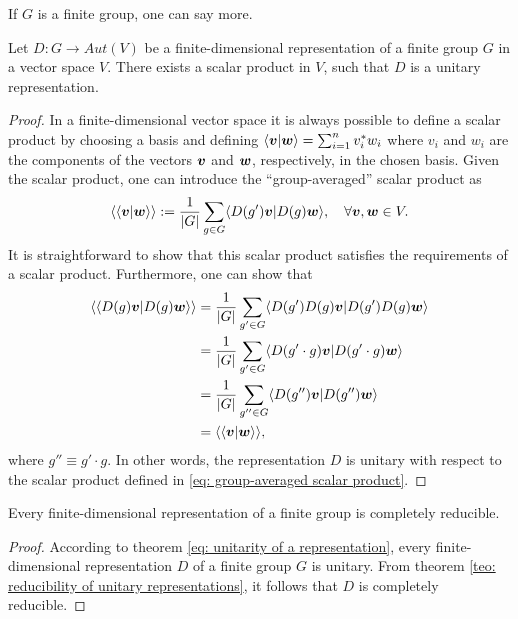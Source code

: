 If $G$ is a finite group, one can say more.
\begin{teo}
\label{eq: unitarity of a representation}
    Let $D : G \to Aut(V)$ be a finite-dimensional representation of a finite group $G$ in a vector space $V$. There exists a scalar product in $V$, such that $D$ is a unitary representation.
\end{teo}
\begin{proof}
    In a finite-dimensional vector space it is always possible to define a scalar product by choosing a basis and defining $\langle \bm{v} | \bm{w} \rangle = \sum_{i=1}^n v_i^*w_i$ where $v_i$ and $w_i$ are the components of the vectors $\bm{v}$ and $\bm{w}$, respectively, in the chosen basis. Given the scalar product, one can introduce the ``group-averaged'' scalar product as 
    \begin{equation}
    \label{eq: group-averaged scalar product}
        \langle\langle \bm{v} | \bm{w} \rangle\rangle := \frac{1}{|G|}\sum_{g \in G}\langle D(g')\bm{v} | D(g)\bm{w} \rangle,\quad \forall \bm{v},\bm{w} \in V.
    \end{equation}
    It is straightforward to show that this scalar product satisfies the requirements of a scalar product. Furthermore, one can show that 
    \begin{equation}
        \begin{split}
            \langle\langle D(g)\bm{v} | D(g)\bm{w} \rangle\rangle &= \frac{1}{|G|}\sum_{g' \in G}\langle D(g')D(g)\bm{v} | D(g')D(g)\bm{w} \rangle \\
            &= \frac{1}{|G|}\sum_{g' \in G}\langle D(g' \cdot g)\bm{v} | D(g' \cdot g)\bm{w} \rangle \\
            &= \frac{1}{|G|}\sum_{g'' \in G}\langle D(g'')\bm{v} | D(g'')\bm{w} \rangle \\
            &= \langle\langle \bm{v} | \bm{w} \rangle\rangle,
        \end{split}
    \end{equation}
    where $g'' \equiv g' \cdot g$. In other words, the representation $D$ is unitary with respect to the scalar product defined in \eqref{eq: group-averaged scalar product}.
\end{proof}
\begin{teo}
\label{teo: Maschke's theorem}
    Every finite-dimensional representation of a finite group is completely reducible.
\end{teo}
\begin{proof}
    According to theorem \ref{eq: unitarity of a representation}, every finite-dimensional representation $D$ of a finite group $G$ is unitary. From theorem \ref{teo: reducibility of unitary representations}, it follows that $D$ is completely reducible.
\end{proof}

